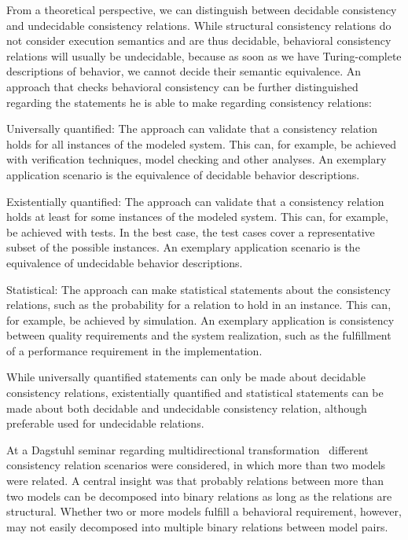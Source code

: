From a theoretical perspective, we can distinguish between decidable consistency and undecidable consistency relations.
While structural consistency relations do not consider execution semantics and are thus decidable, behavioral consistency relations will usually be undecidable, because as soon as we have Turing-complete descriptions of behavior, we cannot decide their semantic equivalence. 
An approach that checks behavioral consistency can be further distinguished regarding the statements he is able to make regarding consistency relations:
\begin{properdescription}
    \item[Universally quantified:] The approach can validate that a consistency relation holds for all instances of the modeled system. This can, for example, be achieved with verification techniques, model checking and other analyses. An exemplary application scenario is the equivalence of decidable behavior descriptions.
    \item[Existentially quantified:] The approach can validate that a consistency relation holds at least for some instances of the modeled system. This can, for example, be achieved with tests. In the best case, the test cases cover a representative subset of the possible instances. An exemplary application scenario is the equivalence of undecidable behavior descriptions.
    \item[Statistical:] The approach can make statistical statements about the consistency relations, such as the probability for a relation to hold in an instance. This can, for example, be achieved by simulation. An exemplary application is consistency between quality requirements and the system realization, such as the fulfillment of a performance requirement in the implementation.
\end{properdescription}
While universally quantified statements can only be made about decidable consistency relations, existentially quantified and statistical statements can be made about both decidable and undecidable consistency relation, although preferable used for undecidable relations.

At a Dagstuhl seminar regarding multidirectional transformation~\cite{cleve2019dagstuhl} different consistency relation scenarios were considered, in which more than two models were related.
A central insight was that probably relations between more than two models can be decomposed into binary relations as long as the relations are structural.
Whether two or more models fulfill a behavioral requirement, however, may not easily decomposed into multiple binary relations between model pairs.



